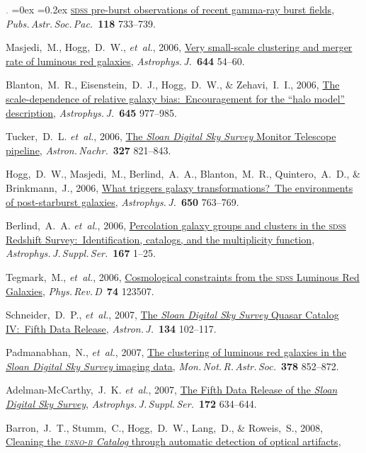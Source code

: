 \documentclass[12pt,letterpaper]{article}
\newcommand{\latin}[1]{\textsl{#1}}
\newcommand{\etal}{\latin{et~al.}}
\newcommand{\project}[1]{\textsl{#1}}
\newcommand{\doi}[2]{\href{http://dx.doi.org/#1}{{#2}}}
\newcommand{\deemph}[1]{\textcolor{grey}{\footnotesize{#1}}}
\newcommand{\pubnumber}[1]{\deemph{{#1}.}}
\newcounter{refpubnum}
\newcommand{\hogglist}{%
    \rightmargin=0in
    \leftmargin=0.18in
    \topsep=0ex
    \partopsep=0pt
    \itemsep=0.2ex
    \parsep=0pt
    \itemindent=-1.0\leftmargin
    \listparindent=0.0\leftmargin
    \settowidth{\labelsep}{~}
    \usecounter{refpubnum}
  }
\begin{document}
\begin{list}{\pubnumber{\therefpubnum}}{\hogglist}
\doi{10.1086/503334}{\textsc{sdss} pre-burst observations of recent gamma-ray burst fields},
\textit{Pubs.\,Astr.\,Soc.\,Pac.}\ \textbf{118} 733--739.
\item\label{pub:Masjedi2006}
Masjedi,~M., Hogg,~D.~W., \etal, 2006,
\doi{10.1086/503536}{Very small-scale clustering and merger rate of luminous red galaxies},
\textit{Astrophys.\,J.}\ \textbf{644} 54--60.
\item
Blanton,~M.~R., Eisenstein,~D.~J., Hogg,~D.~W., \& Zehavi,~I.~I., 2006,
\doi{10.1086/500918}{The scale-dependence of relative galaxy bias:\ Encouragement for the ``halo model'' description},
\textit{Astrophys.\,J.}\ \textbf{645}
977--985.
\item
Tucker,~D.~L. \etal, 2006,
\doi{10.1002/asna.200610655}{The \project{Sloan Digital Sky Survey} Monitor Telescope pipeline},
\textit{Astron.\,Nachr.}\ \textbf{327} 821--843.
\item
Hogg,~D.~W., Masjedi,~M., Berlind,~A.~A., Blanton,~M.~R., Quintero,~A.~D., \& Brinkmann,~J., 2006,
\doi{10.1086/507172}{What triggers galaxy transformations?\ The environments of post-starburst galaxies},
\textit{Astrophys.\,J.}\ \textbf{650} 763--769.
\item
Berlind,~A.~A. \etal, 2006,
\doi{10.1086/508170}{Percolation galaxy groups and clusters in the \textsc{sdss} Redshift Survey:\ Identification, catalogs, and the multiplicity function},
\textit{Astrophys.\,J.\,Suppl.\,Ser.}\ \textbf{167} 1--25.
\item
Tegmark,~M., \etal, 2006,
\doi{10.1103/PhysRevD.74.123507}{Cosmological constraints from the \textsc{sdss} Luminous Red Galaxies},
\textit{Phys.\,Rev.\,D}\ \textbf{74} 123507.
\item
Schneider,~D.~P., \etal, 2007,
\doi{10.1086/518474}{The \project{Sloan Digital Sky Survey} Quasar Catalog IV:\ Fifth Data Release},
\textit{Astron.\,J.}\ \textbf{134} 102--117.
\item
Padmanabhan,~N., \etal, 2007,
\doi{10.1111/j.1365-2966.2007.11593.x}{The clustering of luminous red galaxies in the \project{Sloan Digital Sky Survey} imaging data},
\textit{Mon.\,Not.\,R.\,Astr.\,Soc.}\ \textbf{378} 852--872.
\item
Adelman-McCarthy,~J.~K. \etal, 2007,
\doi{10.1086/518864}{The Fifth Data Release of the \project{Sloan Digital Sky Survey}},
\textit{Astrophys.\,J.\,Suppl.\,Ser.}\ \textbf{172} 634--644.
\item
Barron,~J.~T., Stumm,~C., Hogg,~D.~W., Lang,~D., \& Roweis,~S., 2008,
\doi{10.1088/0004-6256/135/1/414}{Cleaning the \project{\textsc{usno-b} Catalog} through automatic detection of optical artifacts},

\end{list}
\end{document}
